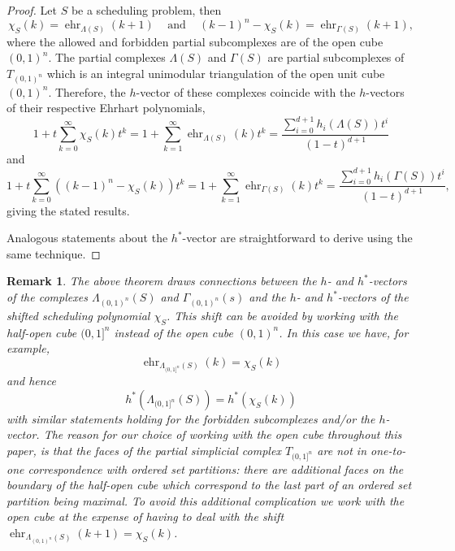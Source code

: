 \documentclass[12pt,reqno]{amsart}
\numberwithin{definition}{section}
\newtheorem{remark}[definition]{Remark}
\theoremstyle{definition}
\newcommand{\ehr}{\operatorname{ehr}}
\newcommand{\T}{T} %
\newcommand{\TC}{\T_{(0,1)^n}} %
\newcommand{\allow}{\Lambda} %
\newcommand{\poly}{\chi} %
\newcommand{\forb}{\Gamma} %
\newcommand{\allowC}{\allow_{(0,1)^n}} %
\newcommand{\forbC}{\forb_{(0,1)^n}} %
\begin{document}


\begin{proof}
Let $S$ be a scheduling problem, then
\[
  \poly_S(k) = \ehr_{\allow(S)}(k+1) \;\;\; \text{ and } \;\;\; (k-1)^n - \poly_{S}(k) = \ehr_{\forb(S)}(k+1),
\]
where the allowed and forbidden partial subcomplexes are of the open cube $(0,1)^n$. The partial complexes $\allow(S)$ and $\forb(S)$ are partial subcomplexes of $\TC$ which is an integral unimodular triangulation of the open unit cube $(0,1)^n$. Therefore, the $h$-vector of these complexes coincide with the $h$-vectors of their respective Ehrhart polynomials,
\[
 1 + t\sum_{k = 0}^\infty \poly_S(k) t^k =  1 + \sum_{k = 1}^\infty \ehr_{\allow(S)}(k) t^k = \frac{\sum_{i=0}^{d+1} h_i(\allow(S)) t^i}{(1-t)^{d+1}}
\]
and
\[
 1 + t\sum_{k = 0}^\infty \left( (k-1)^n - \poly_S(k) \right) t^k =  1 + \sum_{k = 1}^\infty \ehr_{\forb(S)}(k) t^k = \frac{\sum_{i=0}^{d+1} h_i(\forb(S)) t^i}{(1-t)^{d+1}},
\]
giving the stated results.

 Analogous statements about the $h^*$-vector are straightforward to derive using the same technique.


\end{proof}

\begin{remark}
The above theorem draws connections between the $h$- and $h^*$-vectors of the complexes $\allowC(S)$ and $\forbC(s)$ and the $h$- and $h^*$-vectors of the \emph{shifted} scheduling polynomial $\poly_S$. This shift can be avoided by working with the half-open cube $(0,1]^n$ instead of the open cube $(0,1)^n$. In this case we have, for example,
\[
  \ehr_{\allow_{(0,1]^n}(S)}(k) = \poly_S(k)
\]
and hence
\[
  h^*(\allow_{(0,1]^n}(S)) = h^*(\poly_S(k))
\]
with similar statements holding for the forbidden subcomplexes and/or the $h$-vector. The reason for our choice of working with the open cube throughout this paper, is that the faces of the partial simplicial complex $T_{(0,1]^n}$ are not in one-to-one correspondence with ordered set partitions: there are additional faces on the boundary of the half-open cube which correspond to the last part of an ordered set partition being maximal. To avoid this additional complication we work with the open cube at the expense of having to deal with the shift $\ehr_{\allow_{(0,1)^n}(S)}(k+1) = \poly_S(k)$.
\end{remark}
\end{document}
